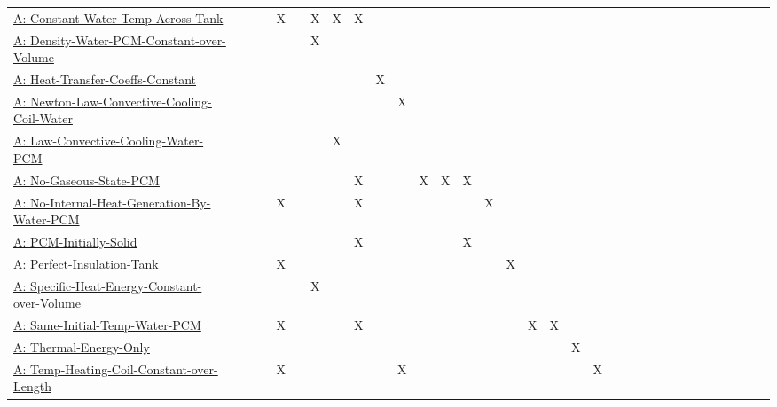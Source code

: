 \documentclass[12pt]{article}
\begin{document}
\begin{longtable}{l l l l l l l l l l l l l l l l l l l l l l l l l l l l l l l l l}
\\
\hyperref[assumpCWTAT]{A: Constant-Water-Temp-Across-Tank} &  &  &  & X &  & X & X & X &  &  &  &  &  &  &  &  &  &  &  &  &  &  &  &  &  &  &  &  &  &  &  & 
\\
\hyperref[assumpDWPCoV]{A: Density-Water-PCM-Constant-over-Volume} &  &  &  &  &  & X &  &  &  &  &  &  &  &  &  &  &  &  &  &  &  &  &  &  &  &  &  &  &  &  &  & 
\\
\hyperref[assumpHTCC]{A: Heat-Transfer-Coeffs-Constant} &  &  &  &  &  &  &  &  & X &  &  &  &  &  &  &  &  &  &  &  &  &  &  &  &  &  &  &  &  &  &  & 
\\
\hyperref[assumpLCCCW]{A: Newton-Law-Convective-Cooling-Coil-Water} &  &  &  &  &  &  &  &  &  & X &  &  &  &  &  &  &  &  &  &  &  &  &  &  &  &  &  &  &  &  &  & 
\\
\hyperref[assumpLCCWP]{A: Law-Convective-Cooling-Water-PCM} &  &  &  &  &  &  & X &  &  &  &  &  &  &  &  &  &  &  &  &  &  &  &  &  &  &  &  &  &  &  &  & 
\\
\hyperref[assumpNGSP]{A: No-Gaseous-State-PCM} &  &  &  &  &  &  &  & X &  &  & X & X & X &  &  &  &  &  &  &  &  &  &  &  &  &  &  &  &  &  &  & 
\\
\hyperref[assumpNIHGBWP]{A: No-Internal-Heat-Generation-By-Water-PCM} &  &  &  & X &  &  &  & X &  &  &  &  &  & X &  &  &  &  &  &  &  &  &  &  &  &  &  &  &  &  &  & 
\\
\hyperref[assumpPIS]{A: PCM-Initially-Solid} &  &  &  &  &  &  &  & X &  &  &  &  & X &  &  &  &  &  &  &  &  &  &  &  &  &  &  &  &  &  &  & 
\\
\hyperref[assumpPIT]{A: Perfect-Insulation-Tank} &  &  &  & X &  &  &  &  &  &  &  &  &  &  & X &  &  &  &  &  &  &  &  &  &  &  &  &  &  &  &  & 
\\
\hyperref[assumpSHECov]{A: Specific-Heat-Energy-Constant-over-Volume} &  &  &  &  &  & X &  &  &  &  &  &  &  &  &  &  &  &  &  &  &  &  &  &  &  &  &  &  &  &  &  & 
\\
\hyperref[assumpSITWP]{A: Same-Initial-Temp-Water-PCM} &  &  &  & X &  &  &  & X &  &  &  &  &  &  &  & X & X &  &  &  &  &  &  &  &  &  &  &  &  &  &  & 
\\
\hyperref[assumpTEO]{A: Thermal-Energy-Only} &  &  &  &  &  &  &  &  &  &  &  &  &  &  &  &  &  & X &  &  &  &  &  &  &  &  &  &  &  &  &  & 
\\
\hyperref[assumpTHCCoL]{A: Temp-Heating-Coil-Constant-over-Length} &  &  &  & X &  &  &  &  &  & X &  &  &  &  &  &  &  &  & X &  &  &  &  &  &  &  &  &  &  &  &  & 
\\

\end{longtable}
\end{document}
